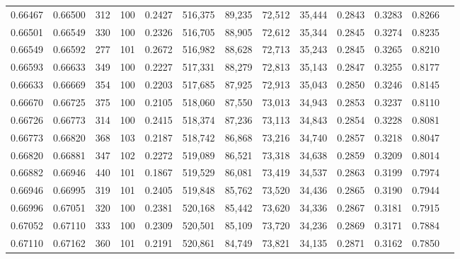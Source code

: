 \begin{tabular}{rrrrrrrrrrrrr}
0.66467 & 0.66500 &   312 & 100 &                                     0.2427 & 516,375 &  89,235 &  72,512 &  35,444 & 0.2843 & 0.3283 & 0.8266 \\
0.66501 & 0.66549 &   330 & 100 &                                     0.2326 & 516,705 &  88,905 &  72,612 &  35,344 & 0.2845 & 0.3274 & 0.8235 \\
0.66549 & 0.66592 &   277 & 101 &                                     0.2672 & 516,982 &  88,628 &  72,713 &  35,243 & 0.2845 & 0.3265 & 0.8210 \\
0.66593 & 0.66633 &   349 & 100 &                                     0.2227 & 517,331 &  88,279 &  72,813 &  35,143 & 0.2847 & 0.3255 & 0.8177 \\
0.66633 & 0.66669 &   354 & 100 &                                     0.2203 & 517,685 &  87,925 &  72,913 &  35,043 & 0.2850 & 0.3246 & 0.8145 \\
0.66670 & 0.66725 &   375 & 100 &                                     0.2105 & 518,060 &  87,550 &  73,013 &  34,943 & 0.2853 & 0.3237 & 0.8110 \\
0.66726 & 0.66773 &   314 & 100 &                                     0.2415 & 518,374 &  87,236 &  73,113 &  34,843 & 0.2854 & 0.3228 & 0.8081 \\
0.66773 & 0.66820 &   368 & 103 &                                     0.2187 & 518,742 &  86,868 &  73,216 &  34,740 & 0.2857 & 0.3218 & 0.8047 \\
0.66820 & 0.66881 &   347 & 102 &                                     0.2272 & 519,089 &  86,521 &  73,318 &  34,638 & 0.2859 & 0.3209 & 0.8014 \\
0.66882 & 0.66946 &   440 & 101 &                                     0.1867 & 519,529 &  86,081 &  73,419 &  34,537 & 0.2863 & 0.3199 & 0.7974 \\
0.66946 & 0.66995 &   319 & 101 &                                     0.2405 & 519,848 &  85,762 &  73,520 &  34,436 & 0.2865 & 0.3190 & 0.7944 \\
0.66996 & 0.67051 &   320 & 100 &                                     0.2381 & 520,168 &  85,442 &  73,620 &  34,336 & 0.2867 & 0.3181 & 0.7915 \\
0.67052 & 0.67110 &   333 & 100 &                                     0.2309 & 520,501 &  85,109 &  73,720 &  34,236 & 0.2869 & 0.3171 & 0.7884 \\
0.67110 & 0.67162 &   360 & 101 &                                     0.2191 & 520,861 &  84,749 &  73,821 &  34,135 & 0.2871 & 0.3162 & 0.7850 \\

\end{tabular}
